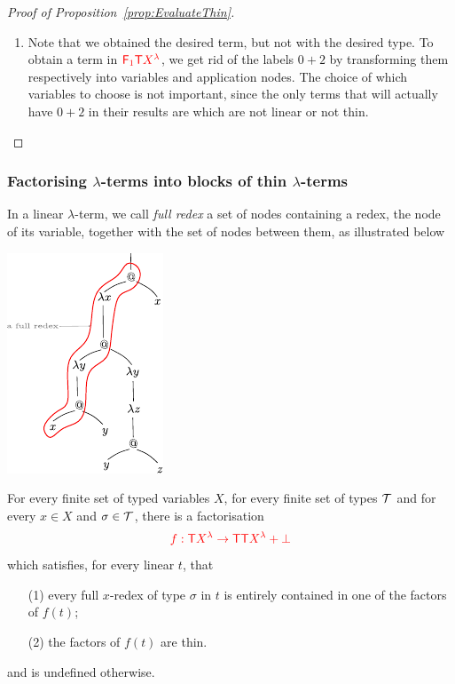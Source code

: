 \begin{proof}[Proof of Proposition~\ref{prop:EvaluateThin}]
\begin{enumerate}
\item Note that we obtained the desired term, but not with the desired type. To obtain a term in 
${\color{red}{{\color{red}{\mathsf F_{1}}}{\color{red}{\mathsf T}}{X^\lambda}}}$, we get rid of the labels $0+2$ by transforming them respectively into variables and application nodes. The choice of which variables to choose is not important, since the only terms that will actually have $0+2$ in their results are \lambdaterms which are not linear or not thin.
\end{enumerate}
\end{proof}

  



\subsubsection{Factorising $\lambda$-terms into blocks of thin $\lambda$-terms}\label{subsub:facto}

In a linear $\lambda$-term, we call \emph{full redex} a set of nodes  containing a redex, the node of its variable, together with the set of nodes between them, as illustrated below
\begin{center}
\includegraphics[scale=1.2]{pictures/full-redex.pdf}
\end{center}


\begin{proposition}\label{prop:FactoIntoThin} For every finite set of typed variables $X$, for every finite set of types ${\mathcal T}$ and for every $x\in X$ and $\sigma\in {\mathcal T}$, there is a factorisation $${\color{red}{f:{\color{red}{\mathsf T}}{\color{red}{X^\lambda}} \to {\color{red}{\mathsf T}}{\color{red}{\mathsf T}}{\color{red}{X^\lambda}}+\bot}}$$ 
which satisfies, for every linear \lambdaterm $t$, that
\begin{itemize}
\item[(1)] every full $x$-redex of type $\sigma$ in $t$ is entirely contained in one of the factors of $f(t)$;
\item[(2)] the factors of $f(t)$ are thin.
\end{itemize}
and is undefined otherwise.
\end{proposition}

